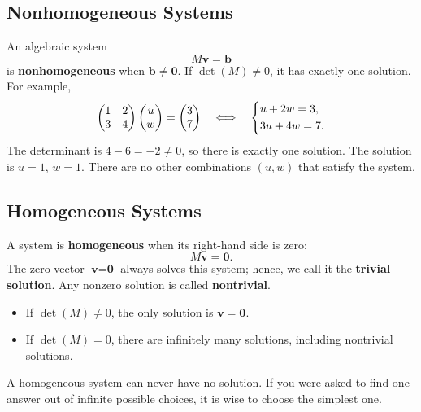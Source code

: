 \documentclass[10pt,letterpaper]{article}
\begin{document}
\subsection{Nonhomogeneous Systems}
An algebraic system $$M\mathbf{v}=\mathbf{b}$$ is
\textbf{nonhomogeneous} when $\mathbf{b}\ne\mathbf{0}$.
If $\det(M)\ne0$, it has exactly one solution. For example,
\[
\begin{pmatrix}1&2\\3&4\end{pmatrix}
\begin{pmatrix}u\\w\end{pmatrix}
=\begin{pmatrix}3\\7\end{pmatrix}
\quad\Longleftrightarrow\quad
\begin{dcases}u+2w=3,\\3u+4w=7.\end{dcases}
\]
The determinant is $4-6=-2\ne0$, so there is exactly one solution. The solution is $u=1$, $w=1.$ There are no other combinations $(u,w)$ that satisfy the system.

\subsection{Homogeneous Systems}
A system is \textbf{homogeneous} when its right-hand side is zero:
\[
M\mathbf{v}=\mathbf{0}.
\]
The zero vector $\textbf{v}=\textbf{0}$ always solves this system; hence, we call it the
\textbf{trivial solution}. Any nonzero solution is called
\textbf{nontrivial}.
\begin{itemize}
\item If $\det(M)\ne0$, the only solution is $\mathbf{v}=\mathbf{0}$.
\item If $\det(M)=0$, there are infinitely many solutions,
including nontrivial solutions.
\end{itemize}
A homogeneous system can never have no solution. If you were asked to find one answer out of infinite possible choices, it is wise to choose the simplest one.
\end{document}
